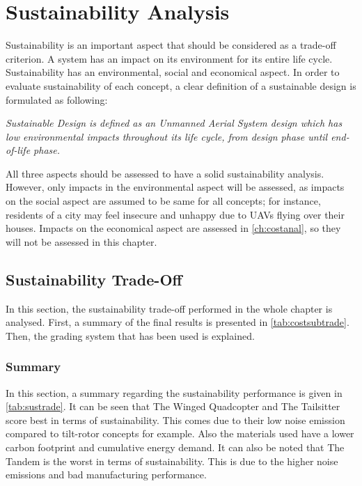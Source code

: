 \chapter{Sustainability Analysis}
\label{ch:sustain}
\setlength{\parindent}{15pt}

Sustainability is an important aspect that should be considered as a trade-off criterion. A system has an impact on its environment for its entire life cycle. Sustainability has an environmental, social and economical aspect. In order to evaluate sustainability of each concept, a clear definition of a sustainable design is formulated as following:


\begin{displayquote}
\textit{Sustainable Design is defined as an Unmanned Aerial System design which has low environmental impacts throughout its life cycle, from design phase until end-of-life phase.}
\end{displayquote}


All three aspects should be assessed to have a solid sustainability analysis. However, only impacts in the environmental aspect will be assessed, as impacts on the social aspect are assumed to be same for all concepts; for instance, residents of a city may feel insecure  and unhappy due to UAVs flying over their houses. Impacts on the economical aspect are assessed in \autoref{ch:costanal}, so they will not be assessed in this chapter. 

\section{Sustainability Trade-Off}

In this section, the sustainability trade-off performed in the whole chapter is analysed. First, a summary of the final results is presented in \autoref{tab:costsubtrade}. Then, the grading system that has been used is explained.  

\subsection{Summary}

In this section, a summary regarding the sustainability performance is given in \autoref{tab:sustrade}. It can be seen that The Winged Quadcopter and The Tailsitter score best in terms of sustainability. This comes due to their low noise emission compared to tilt-rotor concepts for example. Also the materials used have a lower carbon footprint and cumulative energy demand. 
It can also be noted that The Tandem is the worst in terms of sustainability. This is due to the higher noise emissions and bad manufacturing performance.


